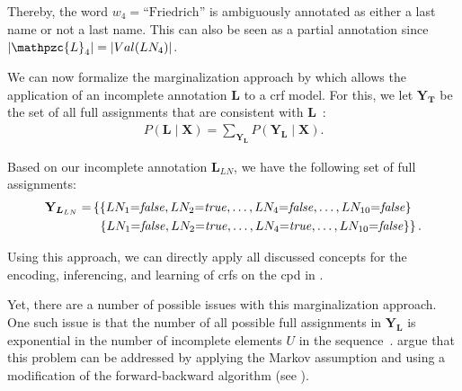 Thereby, the word $w_4{=}\text{``Friedrich''}$ is ambiguously annotated as either a last name or not a last name.
This can also be seen as a \gls{partial annotation} since $|\mathpzc{L}_4|=|Val(LN_4)|$.

\bigskip

We can now formalize the marginalization approach by \citet{tsuboi2008training} which allows the application of an incomplete annotation $\bm{L}$ to a \gls{crf} model.
For this, we let $\mathbf{Y}_{\bm{T}}$ be the set of all \glspl{full assignment} that are consistent with $\bm{L}$~\citep{tsuboi2008training}:
\begin{equation}
  \label{equ:crf-marginalization}
  \begin{split}
    P\left(\bm{L}\mid\mathbf{X}\right)=\sum_{\mathbf{Y}_{\bm{L}}}P\left(\mathbf{Y}_{\bm{L}}\mid\mathbf{X}\right).
  \end{split}
\end{equation}

Based on our incomplete annotation $\bm{L}_{LN}$, we have the following set of \glspl{full assignment}:
\begin{equation*}
\begin{split}
  \mathbf{Y}_{\bm{L}_{LN}}=&\left\{\{LN_1{=}\mathit{false},LN_2{=}\mathit{true},\dots,LN_4{=}\mathit{false},\dots,LN_{10}{=}\mathit{false}\}\right.\\
  &\hspace{0.15cm}\left.\{LN_1{=}\mathit{false},LN_2{=}\mathit{true},\dots,LN_4{=}\mathit{true},\dots,LN_{10}{=}\mathit{false}\}\right\}.\\
\end{split}
\end{equation*}

Using this approach, we can directly apply all discussed concepts for the encoding, inferencing, and learning of \glspl{crf} on the \gls{cpd} in .

\bigskip

Yet, there are a number of possible issues with this marginalization approach.
One such issue is that the number of all possible \glspl{full assignment} in $\mathbf{Y}_{\bm{L}}$ is exponential in the number of incomplete elements $U$ in the sequence~\citep{tsuboi2008training}.
\citet{tsuboi2008training} argue that this problem can be addressed by applying the Markov assumption and using a modification of the forward-backward algorithm (see ).

